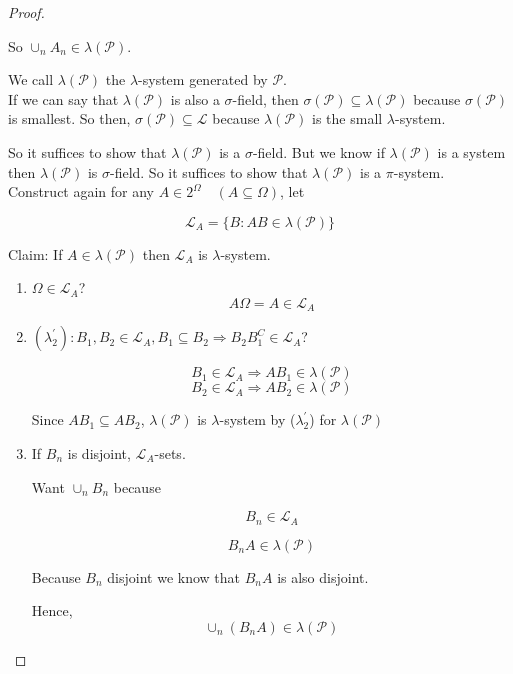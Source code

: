 \documentclass[11pt,fleqn]{book} %
\begin{document}
\begin{proof}
\begin{enumerate}
		So $\cup_n A_n \in \lambda(\mathscr{P})$. 

		We call $\lambda(\mathscr{P})$ the $\lambda$-system generated by $\mathscr{P}$.\\

		If we can say that $\lambda(\mathscr{P})$ is also a $\sigma$-field, then $\sigma(\mathscr{P}) \subseteq \lambda(\mathscr{P})$ because $\sigma(\mathscr{P})$ is smallest. So then, $\sigma(\mathscr{P}) \subseteq \mathscr{L}$ because $\lambda(\mathscr{P})$ is the small $\lambda$-system. 

		So it suffices to show that $\lambda(\mathscr{P})$ is a $\sigma$-field. But we know if $\lambda(\mathscr{P})$ is a system then $\lambda(\mathscr{P})$ is $\sigma$-field. So it suffices to show that $\lambda(\mathscr{P})$ is a $\pi$-system.  \\

		Construct again for any $A \in 2^\Omega \quad (A \subseteq \Omega)$, let

		$$\mathscr{L}_A = \{B: AB \in \lambda(\mathscr{P}) \}$$

		Claim: If $A \in \lambda(\mathscr{P})$ then $\mathscr{L}_A$ is $\lambda$-system.\\

		\begin{enumerate}
			\item $\Omega \in \mathscr{L}_A$? 
				$$A\Omega = A \in \mathscr{L}_A$$
			\item $(\lambda_2^\prime) : B_1, B_2 \in \mathscr{L}_A, B_1 \subseteq  B_2 \Rightarrow B_2B_1^C \in \mathscr{L}_A $?

			$$B_1 \in \mathscr{L}_A \Rightarrow AB_1 \in \lambda(\mathscr{P}) $$
			$$B_2 \in \mathscr{L}_A \Rightarrow AB_2 \in \lambda(\mathscr{P}) $$

			Since $AB_1 \subseteq AB_2$, $\lambda(\mathscr{P})$ is $\lambda$-system by ($\lambda_2^\prime$) for $\lambda(\mathscr{P})$


			\item If $B_n$ is disjoint, $\mathscr{L}_A$-sets. 

			Want $\cup_n B_n$ because 

			$$B_n \in \mathscr{L}_A $$

			$$B_n A \in \lambda(\mathscr{P}) $$

			Because $B_n$ disjoint we know that $B_n A$ is also disjoint.

			Hence, 
			$$\cup_n(B_n A) \in \lambda(\mathscr{P})$$



\end{enumerate}
\end{enumerate}
\end{proof}
\end{document}

